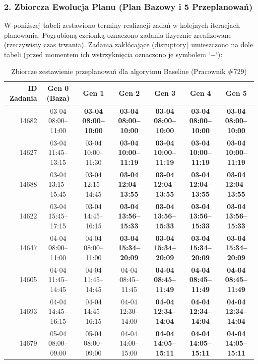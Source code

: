 \subsubsection*{2. Zbiorcza Ewolucja Planu (Plan Bazowy i 5 Przeplanowań)}

W poniższej tabeli zestawiono terminy realizacji zadań w kolejnych iteracjach planowania. Pogrubioną czcionką oznaczono zadania fizycznie zrealizowane (rzeczywisty czas trwania). Zadania zakłócające (disruptory) umieszczono na dole tabeli (przed momentem ich wstrzyknięcia oznaczono je symbolem `$-$`):

\begin{table}[htbp]
\centering\scriptsize
\caption{Zbiorcze zestawienie przeplanowań dla algorytmu Baseline (Pracownik \#729)}
\label{tab:case_study_evolution_baseline_u729}
\begin{tabular}{|r|c|c|c|c|c|c|}
\hline
\textbf{ID Zadania} & \textbf{Gen 0 (Baza)} & \textbf{Gen 1} & \textbf{Gen 2} & \textbf{Gen 3} & \textbf{Gen 4} & \textbf{Gen 5} \\ \hline
14682 & 03-04 08:00--11:00 & \textbf{03-04 08:00--10:00} & \textbf{03-04 08:00--10:00} & \textbf{03-04 08:00--10:00} & \textbf{03-04 08:00--10:00} & \textbf{03-04 08:00--10:00} \\ 
14627 & 03-04 11:45--13:15 & 03-04 10:00--11:30 & \textbf{03-04 10:00--11:19} & \textbf{03-04 10:00--11:19} & \textbf{03-04 10:00--11:19} & \textbf{03-04 10:00--11:19} \\ 
14688 & 03-04 13:15--15:45 & 03-04 12:15--14:45 & \textbf{03-04 12:04--13:55} & \textbf{03-04 12:04--13:55} & \textbf{03-04 12:04--13:55} & \textbf{03-04 12:04--13:55} \\ 
14622 & 03-04 15:45--17:15 & 03-04 14:45--16:15 & \textbf{03-04 13:56--15:33} & \textbf{03-04 13:56--15:33} & \textbf{03-04 13:56--15:33} & \textbf{03-04 13:56--15:33} \\ 
14647 & 04-04 08:00--11:00 & 04-04 08:00--11:00 & \textbf{03-04 15:34--20:09} & \textbf{03-04 15:34--20:09} & \textbf{03-04 15:34--20:09} & \textbf{03-04 15:34--20:09} \\ 
14605 & 04-04 11:45--14:45 & 04-04 11:45--14:45 & 04-04 08:45--11:45 & \textbf{04-04 08:45--11:49} & \textbf{04-04 08:45--11:49} & \textbf{04-04 08:45--11:49} \\ 
14693 & 04-04 14:45--16:15 & 04-04 14:45--16:15 & 04-04 12:30--14:00 & \textbf{04-04 12:34--14:04} & \textbf{04-04 12:34--14:04} & \textbf{04-04 12:34--14:04} \\ 
14679 & 05-04 08:00--09:00 & 05-04 08:00--09:00 & 04-04 14:00--15:00 & \textbf{04-04 14:05--15:11} & \textbf{04-04 14:05--15:11} & \textbf{04-04 14:05--15:11} \\ 

\end{tabular}
\end{table}
